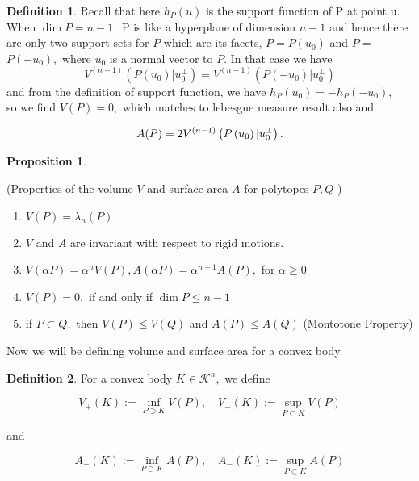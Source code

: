 \documentclass[oneside]{book}
\theoremstyle{definition}
\newtheorem{mydef}{Definition}[chapter]
\newtheorem{prop}{Proposition}
\begin{document}
\begin{mydef}
Recall that here $h_{P}(u)$ is the support function of P at point u. \\

 When $\operatorname{dim} P=n-1, $ P is like a hyperplane of dimension $n - 1$  and hence there are only two support sets for $P$ which are its facets, $P=P\left(u_{0}\right)$ and $P=$ $P\left(-u_{0}\right),$ where $u_{0}$ is a normal vector to $P .$ In that case we have $$V^{(n-1)}\left(P\left(u_{0}\right) | u_{0}^{\perp}\right)=V^{(n-1)}\left(P\left(-u_{0}\right) | u_{0}^{\perp}\right)$$
 \newpage
and from the  definition of support function, we have $h_{P}\left(u_{0}\right)=-h_{P}\left(-u_{0}\right)$,\\ so we find $V(P)=0,$ which matches to lebesgue measure result also  and 
 
 \begin{equation}
 \label{eq45}
 A(P)=2 V^{(n-1)}\left(P\left(u_{0}\right) | u_{0}^{\perp}\right).\\\\
\end{equation}
\end{mydef} 



\begin{prop} \label{prop:1}


(Properties of the volume $V$ and surface area $A$ for polytopes $P, Q$ )
 \begin{enumerate}
 \item  $V(P)=\lambda_{n}(P)$
 \item  $V$ and $A$ are invariant with respect to rigid motions.
 \item $V(\alpha P)=\alpha^{n} V(P), A(\alpha P)=\alpha^{n-1} A(P),$ for $\alpha \geq 0$
 \item $V(P)=0,$ if and only if $\operatorname{dim} P \leq n-1$
 \item  if $P \subset Q,$ then $V(P) \leq V(Q)$ and $A(P) \leq A(Q)$    (Montotone Property)   \label{prop:5}
 \end{enumerate}
  \end{prop}
 
Now we will be defining volume and surface area for a convex body.\\


 \begin{mydef}
  For a convex body $K \in \mathcal{K}^{n},$ we define

$$ V_{+}(K):=\inf _{P \supset K} V(P), \quad V_{-}(K):=\sup _{P \subset K} V(P)$$ 

and

$$ A_{+}(K):=\inf _{P \supset K} A(P), \quad A_{-}(K):=\sup _{P \subset K} A(P) $$ 


 \end{mydef}
\end{document}
